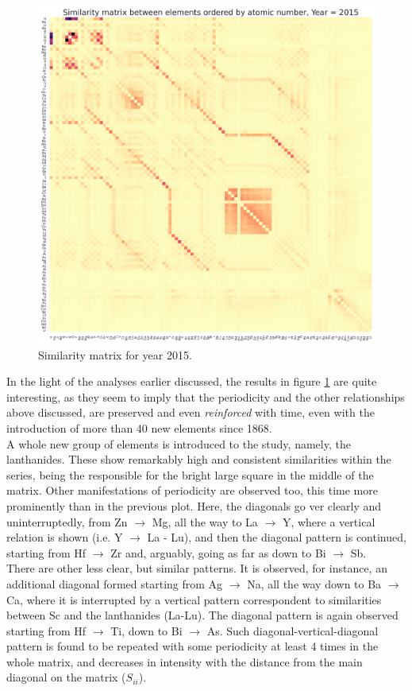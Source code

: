 \documentclass[article]{article}
\begin{document}
\begin{figure}[h!]
  \centering
	\includegraphics[width=12.0cm]{simMat2015.png}
	\caption{Similarity matrix for year 2015.}
	\label{fig:simMat2015}
\end{figure}

In the light of the analyses earlier discussed, the results in figure \ref{fig:simMat2015} are quite interesting, as they seem to imply that the periodicity and the other relationships above discussed, are preserved and even \textit{reinforced} with time, even with the introduction of more than 40 new elements since 1868.\\

A whole new group of elements is introduced to the study, namely, the lanthanides. These show remarkably high and consistent similarities within the series, being the responsible for the bright large square in the middle of the matrix. Other manifestations of periodicity are observed too, this time more prominently than in the previous plot. Here, the diagonals go ver clearly and uninterruptedly, from Zn $\rightarrow$ Mg, all the way to La $\rightarrow$ Y, where a vertical relation is shown (i.e. Y $\rightarrow$ La - Lu), and then the diagonal pattern is continued, starting from Hf $\rightarrow$ Zr and, arguably, going as far as down to Bi $\rightarrow$ Sb.\\

There are other less clear, but similar patterns. It is observed, for instance, an additional diagonal formed starting from Ag $\rightarrow$ Na, all the way down to Ba $\rightarrow$ Ca, where it is interrupted by a  vertical pattern correspondent to similarities between Sc and the lanthanides (La-Lu). The diagonal pattern is again observed starting from Hf $\rightarrow$ Ti, down to Bi $\rightarrow$ As. Such diagonal-vertical-diagonal pattern is found to be repeated with some periodicity at least 4 times in the whole matrix, and decreases in intensity with the distance from the main diagonal on the matrix ($S_{ii}$). \\
\end{document}
